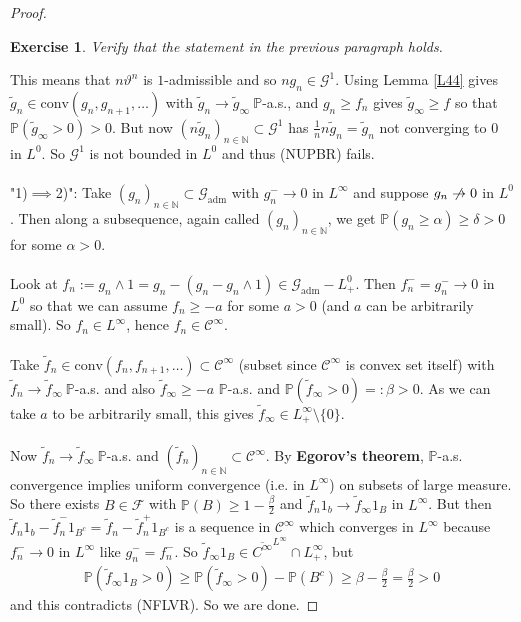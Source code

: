 \documentclass[12pt,a4paper, twoside]{article}
\newtheorem{exe}{Exercise}[section]
\theoremstyle{definition}
\newcommand{\PP}{\mathbb{P}} %
\begin{document}
\begin{proof}
\begin{exe} Verify that the statement in the previous paragraph holds.
\end{exe}
\noindent This means that $n \vartheta^n$ is $1$-admissible and so $n g_n \in \mathcal{G}^1$. Using Lemma \ref{L44} gives $\widetilde{g}_n \in \text{conv}(g_n, g_{n+1}, \dots )$ with $\widetilde{g}_n \to \widetilde{g}_\infty \ \PP$-a.s., and $g_n \geq f_n$ gives $\widetilde{g}_\infty \geq f$ so that $\PP( \widetilde{g}_\infty > 0)>0$. But now $(n \widetilde{g}_n)_{n \in \mathbb{N}} \subset \mathcal{G}^1$ has $\frac{1}{n}n \widetilde{g}_n = \widetilde{g}_n$ not converging to $0$ in $L^0$. So $\mathcal{G}^1$ is not bounded in $L^0$ and thus (NUPBR) fails. 
\\\\
"1)$\implies$2)": Take $(g_n)_{n \in \mathbb{N}} \subset \mathcal{G}_\text{adm}$ with $g_n^- \to 0$ in $L^\infty$ and suppose $g_n \centernot\to 0$ in $L^0$. Then along a subsequence, again called $(g_n)_{n \in \mathbb{N}}$, we get $\PP( g_n \geq \alpha) \geq \delta >0$ for some $\alpha >0$. \\\\
Look at $f_n:= g_n \wedge 1 = g_n-(g_n-g_n \wedge 1) \in \mathcal{G}_\text{adm}-L_+^0$. Then $f_n^- = g_n^- \to 0$ in $L^0$ so that we can assume $f_n \geq - a$ for some $a >0$ (and $a$ can be arbitrarily small). So $f_n \in L^\infty$, hence $f_n \in \mathcal{C}^\infty$. \\
\\
Take $\widetilde{f}_n \in \text{conv}(f_n, f_{n+1}, \dots ) \subset \mathcal{C}^\infty$ (subset since $\mathcal{C}^\infty$ is convex set itself) with $\widetilde{f}_n \to \widetilde{f}_\infty \ \PP$-a.s. and also $\widetilde{f}_\infty \geq -a $ $\PP$-a.s. and $\PP( \widetilde{f}_\infty >0)=: \beta >0$. As we can take $a$ to be arbitrarily small, this gives $\widetilde{f}_\infty \in L_+^\infty \setminus \{0\}$. \\
\\
Now $\widetilde{f}_n \to \widetilde{f}_\infty \ \PP$-a.s. and $(\widetilde{f}_n)_{n \in \mathbb{N}} \subset \mathcal{C}^\infty$. By \textbf{Egorov's theorem}, $\PP$-a.s. convergence implies uniform convergence (i.e. in $L^\infty$) on subsets of large measure. So there exists $B \in \mathcal{F}$ with $\PP(B) \geq 1- \frac{\beta}{2}$ and $\widetilde{f}_n 1_b \to \widetilde{f}_\infty 1_B$ in $L^\infty$. But then $\widetilde{f}_n 1_b - \widetilde{f}_n^- 1_{B^c}= \widetilde{f}_n-\widetilde{f}_n^+ 1_{B^c}$ is a sequence in $\mathcal{C}^\infty$ which converges in $L^\infty$ because $f_n^- \to 0$ in $L^\infty$ like $g_n^-=f_n^-$.  So $\widetilde{f}_\infty 1_B \in \overline{C^\infty}^{L^\infty} \cap L_+^\infty$, but 
\begin{align*}
\PP( \widetilde{f}_\infty 1_B > 0) \geq \PP( \widetilde{f}_\infty >0)- \PP(B^c) \geq \beta - \frac{\beta}{2}= \frac{\beta}{2} >0
\end{align*}
and this contradicts (NFLVR). So we are done. 
\end{proof}
\end{document}
